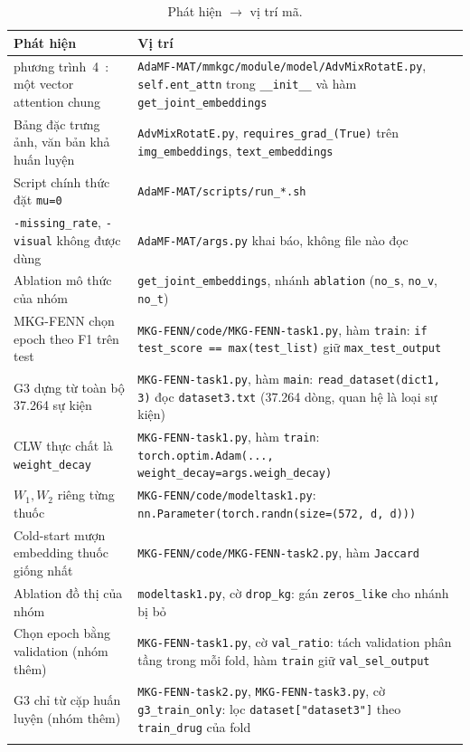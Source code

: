 \documentclass[conference]{IEEEtran}
\begin{document}
\begin{table}[h]
\caption{Phát hiện $\to$ vị trí mã.}
\label{tab:codeloc}
\centering\scriptsize
\renewcommand{\arraystretch}{1.1}
\begin{tabular}{>{\raggedright\arraybackslash}p{2.6cm} >{\raggedright\arraybackslash}p{5.3cm}}
\toprule
Phát hiện & Vị trí \\
\midrule
phương trình~4~\cite{adamfmat}: một vector attention chung &
\nolinkurl{AdaMF-MAT/mmkgc/module/model/AdvMixRotatE.py}, \texttt{self.ent\_attn} trong
\texttt{\_\_init\_\_} và hàm \texttt{get\_joint\_embeddings} \\ \addlinespace[2pt]
Bảng đặc trưng ảnh, văn bản khả huấn luyện &
\nolinkurl{AdvMixRotatE.py}, \texttt{requires\_grad\_(True)} trên \texttt{img\_embeddings}, \texttt{text\_embeddings} \\ \addlinespace[2pt]
Script chính thức đặt \texttt{mu=0} & \texttt{AdaMF-MAT/scripts/run\_*.sh} \\ \addlinespace[2pt]
\texttt{-missing\_rate}, \texttt{-visual} không được dùng & \texttt{AdaMF-MAT/args.py} khai báo, không file nào đọc \\ \addlinespace[2pt]
Ablation mô thức của nhóm & \texttt{get\_joint\_embeddings}, nhánh \texttt{ablation} (\texttt{no\_s}, \texttt{no\_v}, \texttt{no\_t}) \\ \addlinespace[2pt]
MKG-FENN chọn epoch theo F1 trên test &
\nolinkurl{MKG-FENN/code/MKG-FENN-task1.py}, hàm \texttt{train}: \texttt{if test\_score == max(test\_list)} giữ \texttt{max\_test\_output} \\ \addlinespace[2pt]
G3 dựng từ toàn bộ 37.264 sự kiện & \nolinkurl{MKG-FENN-task1.py}, hàm \texttt{main}: \texttt{read\_dataset(dict1, 3)} đọc \nolinkurl{dataset3.txt} (37.264 dòng, quan hệ là loại sự kiện) \\ \addlinespace[2pt]
CLW thực chất là \texttt{weight\_decay} & \nolinkurl{MKG-FENN-task1.py}, hàm \texttt{train}: \texttt{torch.optim.Adam(..., weight\_decay=args.weigh\_decay)} \\ \addlinespace[2pt]
$W_1, W_2$ riêng từng thuốc & \nolinkurl{MKG-FENN/code/modeltask1.py}: \texttt{nn.Parameter(torch.randn(size=(572, d, d)))} \\ \addlinespace[2pt]
Cold-start mượn embedding thuốc giống nhất & \nolinkurl{MKG-FENN/code/MKG-FENN-task2.py}, hàm \texttt{Jaccard} \\ \addlinespace[2pt]
Ablation đồ thị của nhóm & \texttt{modeltask1.py}, cờ \texttt{drop\_kg}: gán \texttt{zeros\_like} cho nhánh bị bỏ \\ \addlinespace[2pt]
Chọn epoch bằng validation (nhóm thêm) & \nolinkurl{MKG-FENN-task1.py}, cờ \texttt{val\_ratio}: tách validation phân tầng trong mỗi fold, hàm \texttt{train} giữ \texttt{val\_sel\_output} \\ \addlinespace[2pt]
G3 chỉ từ cặp huấn luyện (nhóm thêm) & \nolinkurl{MKG-FENN-task2.py}, \nolinkurl{MKG-FENN-task3.py}, cờ \texttt{g3\_train\_only}: lọc \texttt{dataset["dataset3"]} theo \texttt{train\_drug} của fold \\ \addlinespace[2pt]
\bottomrule
\end{tabular}
\end{table}
\end{document}
